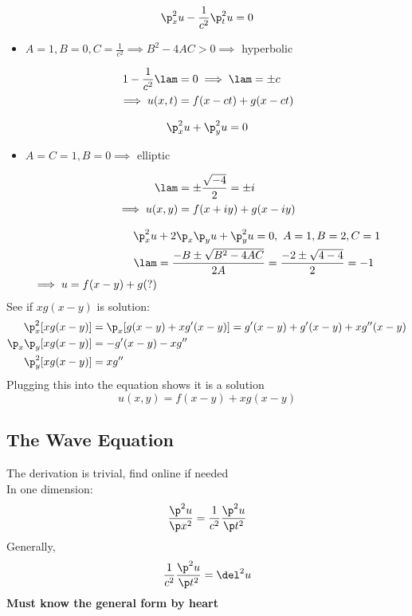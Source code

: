 \documentclass[Maths.tex]{subfiles}
\begin{document}
\begin{example}
\begin{equation}
	\p_x^2u - \frac{1}{c^2}\p_t^2 u = 0
\end{equation}
\begin{itemize}
	\item $A=1, B = 0, C = \frac{1}{c^2} \implies B^2 - 4AC > 0 \implies$ hyperbolic
\end{itemize}
\begin{align}
	1 - \frac{1}{c^2}\lam &= 0 \implies \lam = \pm c \\
	\implies u(x,t) &= f(x - ct) + g(x - ct)
\end{align}
\end{example}

\begin{example}
\begin{equation}
	\p_x^2u + \p_y^2u = 0
\end{equation}
\begin{itemize}
	\item $A = C = 1, B = 0 \implies$ elliptic
\end{itemize}
\begin{align}
	\lam &= \pm \frac{\sqrt{-4}}{2} = \pm i \\
	\implies u(x,y) &= f(x+iy) + g(x-iy)
\end{align}
\end{example}

\begin{example}
\begin{align}
	\p_x^2u &+ 2\p_x\p_yu + \p_y^2u = 0,~ A = 1, B = 2, C = 1 \\
	\lam &= \frac{-B \pm \sqrt{B^2 - 4AC}}{2A} = \frac{-2 \pm \sqrt{4-4}}{2} = -1 \\
	\implies u = f(x-y) + g(?)
\end{align}
See if $xg(x-y)$ is solution:
\begin{align}
	\p_x^2[xg(x-y)] &= \p_x[g(x-y) + xg'(x-y)] = g'(x-y) + g'(x-y) + xg''(x-y) \\
	\p_x\p_y[xg(x-y)] &= -g'(x-y) - xg'' \\
	\p_y^2[xg(x-y)] &= xg''
\end{align}
Plugging this into the equation shows it is a solution
\begin{equation}
	u(x,y) = f(x-y) + xg(x-y)
\end{equation}
\end{example}

\subsection{The Wave Equation}
The derivation is trivial, find online if needed \\
In one dimension:
\begin{equation}
	\frac{\p^2u}{\p x^2} = \frac{1}{c^2}\frac{\p^2u}{\p t^2}
\end{equation}
Generally,
\begin{equation}
	\frac{1}{c^2}\frac{\p^2u}{\p t^2} = \del^2u
\end{equation}
\textbf{Must know the general form by heart}
\end{document}
